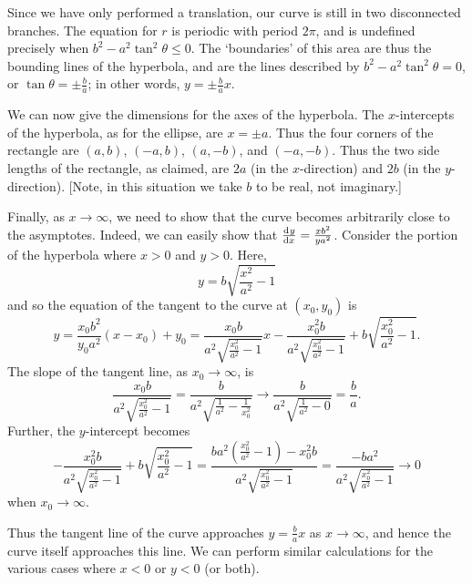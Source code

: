 \documentclass[a4paper,leqno,10pt]{article}
\theoremstyle{exercise}
\theoremstyle{plain}
\theoremstyle{definition}
\theoremstyle{remark}
\begin{document}
Since we have only performed a translation, our curve is still in two disconnected branches. The equation for $ r $ is periodic with period $ 2\pi $,
and is undefined precisely when $ b^2 - a^2 \tan^2 \theta \leq 0 $. The `boundaries' of this area are thus the bounding lines of the hyperbola, and
are the lines described by $ b^2 - a^2 \tan^2 \theta = 0 $, or $ \tan \theta = \pm \frac{b}{a} $; in other words, $ y = \pm \frac{b}{a}x $.

We can now give the dimensions for the axes of the hyperbola. The $ x$-intercepts of the hyperbola, as for the ellipse, are $ x = \pm a $. Thus the
four corners of the rectangle are $ (a, b) $, $ (-a, b) $, $ (a, -b) $, and $ (-a, -b) $. Thus the two side lengths of the rectangle, as claimed,
are $ 2a $ (in the $ x$-direction) and $ 2b $ (in the $ y$-direction). [Note, in this situation we take $ b $ to be real, not imaginary.]

Finally, as $ x \to \infty $, we need to show that the curve becomes arbitrarily close to the asymptotes. Indeed, we can easily show
that $ \od{y}{x} = \frac{x b^2}{y a^2} $. Consider the portion of the hyperbola where $ x > 0 $ and $ y > 0 $. Here,
\begin{displaymath}
  y = b\sqrt{\frac{x^2}{a^2} - 1}
\end{displaymath}
and so the equation of the tangent to the curve at $ (x_0, y_0) $ is
\begin{displaymath}
  y = \frac{x_0 b^2}{y_0 a^2} (x - x_0) + y_0
    = \frac{x_0 b}{a^2\sqrt{\frac{x_0^2}{a^2} - 1}} x - \frac{x_0^2 b}{a^2\sqrt{\frac{x_0^2}{a^2} - 1}} + b\sqrt{\frac{x_0^2}{a^2} - 1}.
\end{displaymath}
The slope of the tangent line, as $ x_0 \to \infty $, is
\begin{displaymath}
 \frac{x_0 b}{a^2\sqrt{\frac{x_0^2}{a^2} - 1}} = \frac{b}{a^2\sqrt{\frac{1}{a^2} - \frac{1}{x_0^2}}} \to \frac{b}{a^2\sqrt{\frac{1}{a^2} - 0}} = \frac{b}{a}.
\end{displaymath}
Further, the $ y$-intercept becomes
\begin{displaymath}
  -\frac{x_0^2 b}{a^2\sqrt{\frac{x_0^2}{a^2} - 1}} + b\sqrt{\frac{x_0^2}{a^2} - 1} = \frac{ba^2(\frac{x_0^2}{a^2} - 1)-x_0^2 b}{a^2\sqrt{\frac{x_0^2}{a^2} - 1}}
    = \frac{- ba^2}{a^2\sqrt{\frac{x_0^2}{a^2} - 1}}
    \to 0
\end{displaymath}
when $ x_0 \to \infty $.

Thus the tangent line of the curve approaches $ y = \frac{b}{a} x $ as $ x \to \infty $, and hence the curve itself approaches this line. We can perform similar
calculations for the various cases where $ x < 0 $ or $ y < 0 $ (or both).
\end{document}
